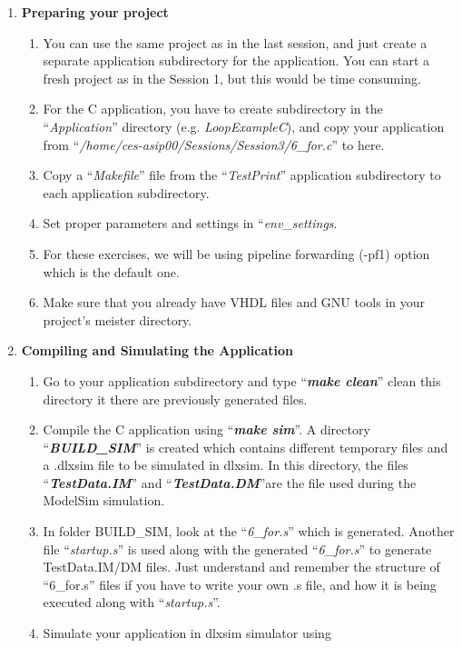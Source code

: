 \begin{enumerate}
\item \textbf{Preparing your project}
	
	\begin{enumerate}
	\item You can use the same project as in the last session, and just create a separate application subdirectory for the application. You can
		start a fresh project as in the Session 1, but this would be time
		consuming.
	\item For the C application, you have to create subdirectory in the
		``\emph{Application}'' directory (e.g. \emph{LoopExampleC}), and
		copy your application from
		``\emph{/home/ces-asip00/Sessions/Session3/6\_for.c}'' to here.
	\item Copy a ``\emph{Makefile}'' file from the ``\emph{TestPrint}''
		application subdirectory to each application subdirectory.
	\item Set proper parameters and settings in ``\emph{env\_settings}.
	\item For these exercises, we will be using pipeline forwarding (-pf1)
		option which is the default one.
	\item Make sure that you already have VHDL files and GNU tools in your
		project's meister directory.
	\end{enumerate}
\item \textbf{Compiling and Simulating the Application}
	\begin{enumerate}
	\item Go to your application subdirectory and type ``\emph{\textbf{make clean}}'' clean this directory it there are previously generated files.
	\item Compile the C application using ``\emph{\textbf{make sim}}''. A directory ``\emph{\textbf{BUILD\_SIM}}'' is created which contains different temporary files and a .dlxsim file to be simulated in dlxsim. In this directory, the files ``\emph{\textbf{TestData.IM}}'' and ``\emph{\textbf{TestData.DM}}''are the file used during the ModelSim simulation.
	\item In folder BUILD\_SIM, look at the ``\emph{6\_for.s}'' which is
	generated. Another file ``\emph{startup.s}'' is used along with the
	generated ``\emph{6\_for.s}'' to generate TestData.IM/DM files. Just
	understand and remember the structure of ``6\_for.s'' files if you
	have to write your own .s file, and how it is being executed along
	with ``\emph{startup.s}''.
	\item
	Simulate your application in dlxsim simulator using

\end{enumerate}
\end{enumerate}
